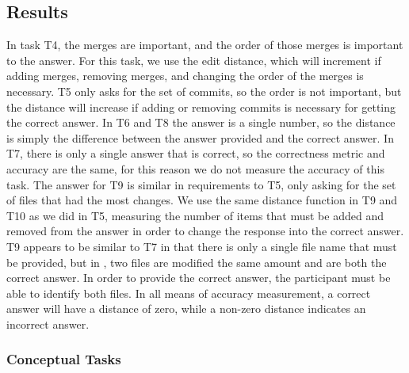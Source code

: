 
\subsection{Results}
\label{sec:results}


In task T4, the merges are important, and the order of those
merges is important to the answer. For this task, we use the edit
distance, which will increment if adding merges, removing merges, and
changing the order of the merges is necessary. T5 only asks for the set
of commits, so the order is not important, but the distance will
increase if adding or removing commits is necessary for getting the
correct answer. In T6 and T8 the answer is a single number, so the
distance is simply the difference between the answer provided and the
correct answer. In T7, there is only a single answer that is correct, so
the correctness metric and accuracy are the same, for this reason we do
not measure the accuracy of this task. The answer for T9 is similar in
requirements to T5, only asking for the set of files that had the most
changes. We use the same distance function in T9 and T10 as we did in
T5, measuring the number of items that must be added and removed from
the answer in order to change the response into the correct answer. %
T9 appears to be similar to T7 in that there is only a single file name
that must be provided, but in \comA, two files are modified the same
amount and are both the correct answer. In order to provide the correct
answer, the participant must be able to identify both files. In all
means of accuracy measurement, a correct answer will have a distance of
zero, while a non-zero distance indicates an incorrect answer.


\subsubsection{Conceptual Tasks}
\label{sub:conceptual_tasks}

